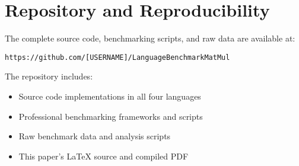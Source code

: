 \documentclass[11pt,a4paper]{article}
\begin{document}
\section{Repository and Reproducibility}

The complete source code, benchmarking scripts, and raw data are available at:

\texttt{https://github.com/[USERNAME]/LanguageBenchmarkMatMul}

The repository includes:
\begin{itemize}
    \item Source code implementations in all four languages
    \item Professional benchmarking frameworks and scripts
    \item Raw benchmark data and analysis scripts
    \item This paper's LaTeX source and compiled PDF
\end{itemize}



\end{document}
